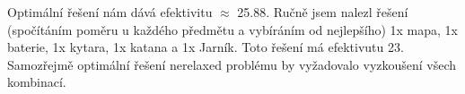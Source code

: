 \documentclass[12pt, a4paper]{article}
\begin{document}
Optimální řešení nám dává efektivitu $\approx$ 25.88. Ručně jsem nalezl řešení (spočítáním poměru  u každého předmětu a vybíráním od nejlepšího) 1x mapa, 1x baterie, 1x kytara, 1x katana a 1x Jarník. Toto řešení má efektivutu 23. Samozřejmě optimální řešení nerelaxed problému by vyžadovalo vyzkoušení všech kombinací.
\end{document}
